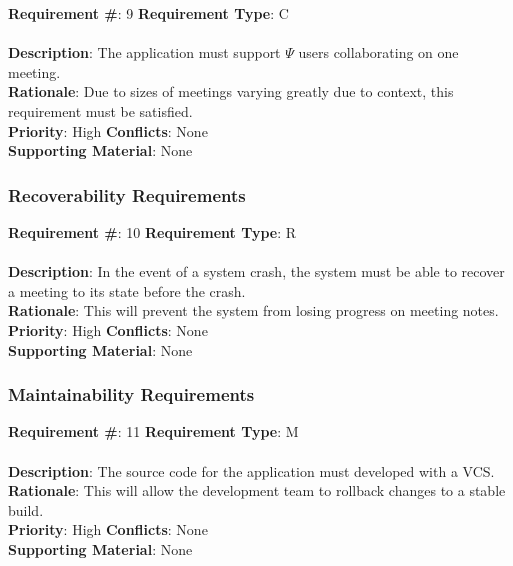 \documentclass[11pt, oneside]{article}
\begin{document}
\begin{framed}
	\noindent\textbf{Requirement \#}: 9 \hfill \textbf{Requirement Type}: C \hfill\\\\
	\noindent\textbf{Description}: The application must support $\Psi$ users collaborating on one meeting.  \\
	\textbf{Rationale}: Due to sizes of meetings varying greatly due to context, this requirement must be satisfied.  \\
	\textbf{Priority}: High \hfill \textbf{Conflicts}: None \hfill\\
	\textbf{Supporting Material}: None\\
\end{framed}
\subsubsection{Recoverability Requirements}

\begin{framed}
	\noindent\textbf{Requirement \#}: 10 \hfill \textbf{Requirement Type}: R \hfill\\\\
	\noindent\textbf{Description}: In the event of a system crash, the system must be able to recover a meeting to its state before the crash. \\ %
	\textbf{Rationale}: This will prevent the system from losing progress on meeting notes. \\
	\textbf{Priority}: High \hfill \textbf{Conflicts}: None \hfill\\
	\textbf{Supporting Material}: None\\
\end{framed}
\newpage
\subsubsection{Maintainability Requirements}

\begin{framed}
	\noindent\textbf{Requirement \#}: 11 \hfill \textbf{Requirement Type}: M \hfill\\\\
	\noindent\textbf{Description}: The source code for the application must developed with a VCS.
	\textbf{Rationale}: This will allow the development team to rollback changes to a stable build. \\
	\textbf{Priority}: High \hfill \textbf{Conflicts}: None \hfill\\
	\textbf{Supporting Material}: None\\
\end{framed}
\end{document}
